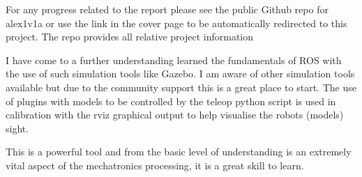 \documentclass[a4paper, 10pt]{IEEEconf}
\begin{document}
For any progress related to the report please see the public Github repo for alex1v1a or use the link in the cover page to be automatically redirected to this project. The repo provides all relative project information

I have come to a further understanding learned the fundamentals of ROS with the use of such simulation tools like Gazebo. I am aware of other simulation tools available but due to the community support this is a great place to start. The use of plugins with models to be controlled by the teleop python script is used in calibration with the rviz graphical output to help visualise the robots (models) sight.

This is a powerful tool and from the basic level of understanding is an extremely vital aspect of the mechatronics processing, it is a great skill to learn.


%
%


%
\end{document}
